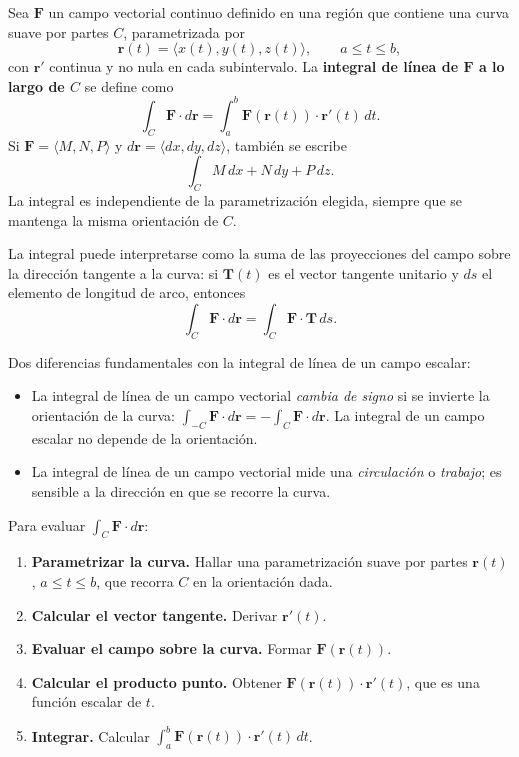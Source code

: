 \begin{definition}
Sea $\mathbf{F}$ un campo vectorial continuo definido en una región que
contiene una curva suave por partes $C$, parametrizada por
\[
\mathbf{r}(t) = \langle x(t), y(t), z(t) \rangle, \qquad a \le t \le b,
\]
con $\mathbf{r}'$ continua y no nula en cada subintervalo. La
\textbf{integral de línea de $\mathbf{F}$ a lo largo de $C$} se define
como
\[
\int_C \mathbf{F} \cdot d\mathbf{r}
= \int_a^b \mathbf{F}(\mathbf{r}(t)) \cdot \mathbf{r}'(t) \, dt.
\]
Si $\mathbf{F} = \langle M, N, P \rangle$ y $d\mathbf{r} = \langle dx,
dy, dz \rangle$, también se escribe
\[
\int_C M\,dx + N\,dy + P\,dz.
\]
La integral es independiente de la parametrización elegida, siempre que
se mantenga la misma orientación de $C$.
\end{definition}

La integral puede interpretarse como la suma de las proyecciones del
campo sobre la dirección tangente a la curva: si $\mathbf{T}(t)$ es el
vector tangente unitario y $ds$ el elemento de longitud de arco,
entonces
\[
\int_C \mathbf{F} \cdot d\mathbf{r}
= \int_C \mathbf{F} \cdot \mathbf{T} \, ds.
\]

\begin{rem}
Dos diferencias fundamentales con la integral de línea de un campo
escalar:
\begin{itemize}
    \item La integral de línea de un campo vectorial \emph{cambia de
    signo} si se invierte la orientación de la curva: $\int_{-C}
    \mathbf{F}\cdot d\mathbf{r} = -\int_C \mathbf{F}\cdot d\mathbf{r}$.
    La integral de un campo escalar no depende de la orientación.
    \item La integral de línea de un campo vectorial mide una
    \emph{circulación} o \emph{trabajo}; es sensible a la dirección en
    que se recorre la curva.
\end{itemize}
\end{rem}

\begin{pasos}
Para evaluar $\displaystyle \int_C \mathbf{F} \cdot d\mathbf{r}$:
\begin{enumerate}
    \item \textbf{Parametrizar la curva.} Hallar una parametrización
    suave por partes $\mathbf{r}(t)$, $a \le t \le b$, que recorra $C$
    en la orientación dada.
    \item \textbf{Calcular el vector tangente.} Derivar $\mathbf{r}' (t)$.
    \item \textbf{Evaluar el campo sobre la curva.} Formar
    $\mathbf{F}(\mathbf{r}(t))$.
    \item \textbf{Calcular el producto punto.} Obtener
    $\mathbf{F}(\mathbf{r}(t)) \cdot \mathbf{r}'(t)$, que es una
    función escalar de $t$.
    \item \textbf{Integrar.} Calcular $\displaystyle \int_a^b
    \mathbf{F}(\mathbf{r}(t)) \cdot \mathbf{r}'(t) \, dt$.
\end{enumerate}
\end{pasos}

